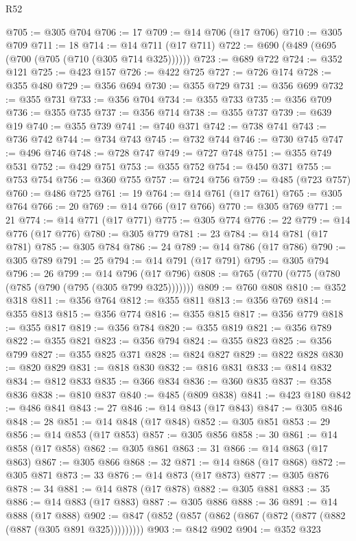 \begin{lexlean}{R52}
\begin{coremodule}
@705 := @305 @704
@706 := 17
@709 := @14 @706 (@17 @706)
@710 := @305 @709
@711 := 18
@714 := @14 @711 (@17 @711)
@722 := @690 (@489 (@695 (@700 (@705 (@710 (@305 @714 @325))))))
@723 := @689 @722
@724 := @352 @121
@725 := @423 @157
@726 := @422 @725
@727 := @726 @174
@728 := @355 @480
@729 := @356 @694
@730 := @355 @729
@731 := @356 @699
@732 := @355 @731
@733 := @356 @704
@734 := @355 @733
@735 := @356 @709
@736 := @355 @735
@737 := @356 @714
@738 := @355 @737
@739 := @639 @19
@740 := @355 @739
@741 := @740 @371
@742 := @738 @741
@743 := @736 @742
@744 := @734 @743
@745 := @732 @744
@746 := @730 @745
@747 := @496 @746
@748 := @728 @747
@749 := @727 @748
@751 := @355 @749 @531
@752 := @429 @751
@753 := @355 @752
@754 := @450 @371
@755 := @753 @754
@756 := @360 @755
@757 := @724 @756
@759 := @485 (@723 @757)
@760 := @486 @725
@761 := 19
@764 := @14 @761 (@17 @761)
@765 := @305 @764
@766 := 20
@769 := @14 @766 (@17 @766)
@770 := @305 @769
@771 := 21
@774 := @14 @771 (@17 @771)
@775 := @305 @774
@776 := 22
@779 := @14 @776 (@17 @776)
@780 := @305 @779
@781 := 23
@784 := @14 @781 (@17 @781)
@785 := @305 @784
@786 := 24
@789 := @14 @786 (@17 @786)
@790 := @305 @789
@791 := 25
@794 := @14 @791 (@17 @791)
@795 := @305 @794
@796 := 26
@799 := @14 @796 (@17 @796)
@808 := @765 (@770 (@775 (@780 (@785 (@790 (@795 (@305 @799 @325)))))))
@809 := @760 @808
@810 := @352 @318
@811 := @356 @764
@812 := @355 @811
@813 := @356 @769
@814 := @355 @813
@815 := @356 @774
@816 := @355 @815
@817 := @356 @779
@818 := @355 @817
@819 := @356 @784
@820 := @355 @819
@821 := @356 @789
@822 := @355 @821
@823 := @356 @794
@824 := @355 @823
@825 := @356 @799
@827 := @355 @825 @371
@828 := @824 @827
@829 := @822 @828
@830 := @820 @829
@831 := @818 @830
@832 := @816 @831
@833 := @814 @832
@834 := @812 @833
@835 := @366 @834
@836 := @360 @835
@837 := @358 @836
@838 := @810 @837
@840 := @485 (@809 @838)
@841 := @423 @180
@842 := @486 @841
@843 := 27
@846 := @14 @843 (@17 @843)
@847 := @305 @846
@848 := 28
@851 := @14 @848 (@17 @848)
@852 := @305 @851
@853 := 29
@856 := @14 @853 (@17 @853)
@857 := @305 @856
@858 := 30
@861 := @14 @858 (@17 @858)
@862 := @305 @861
@863 := 31
@866 := @14 @863 (@17 @863)
@867 := @305 @866
@868 := 32
@871 := @14 @868 (@17 @868)
@872 := @305 @871
@873 := 33
@876 := @14 @873 (@17 @873)
@877 := @305 @876
@878 := 34
@881 := @14 @878 (@17 @878)
@882 := @305 @881
@883 := 35
@886 := @14 @883 (@17 @883)
@887 := @305 @886
@888 := 36
@891 := @14 @888 (@17 @888)
@902 := @847 (@852 (@857 (@862 (@867 (@872 (@877 (@882 (@887 (@305 @891 @325)))))))))
@903 := @842 @902
@904 := @352 @323

\end{coremodule}
\end{lexlean}
